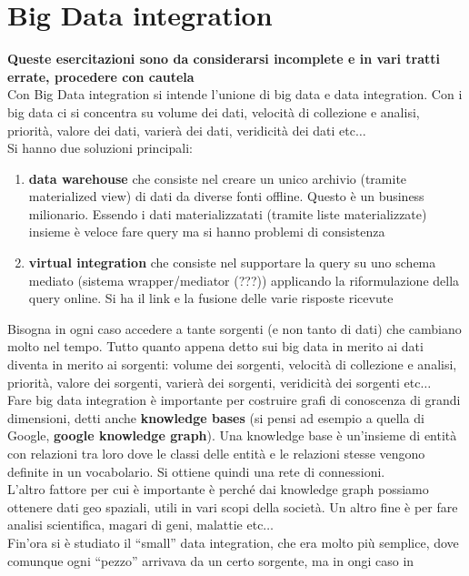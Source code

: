 \documentclass[a4paper,12pt, oneside]{book}
\begin{document}
\section{Big Data integration}
\textbf{Queste esercitazioni sono da considerarsi incomplete e in vari tratti 
errate, procedere con cautela}\\
Con Big Data integration si intende l'unione di big data e data integration. Con
i big data ci si concentra su volume dei dati, velocità di collezione e analisi,
priorità, valore dei dati, varierà dei dati, veridicità dei dati etc$\ldots$\\
Si hanno due soluzioni principali:
\begin{enumerate}
  \item \textbf{data warehouse} che consiste nel creare un unico archivio
  (tramite materialized view) di dati da diverse fonti offline. Questo è un
  business milionario. Essendo i dati materializzatati (tramite liste
  materializzate) insieme è veloce fare query ma si hanno problemi di
  consistenza 
  \item \textbf{virtual integration} che consiste nel supportare la query su
  uno schema mediato (sistema wrapper/mediator (???)) applicando la
  riformulazione della query online. Si ha il link e la fusione delle varie
  risposte ricevute
\end{enumerate}
Bisogna in ogni caso accedere a tante sorgenti (e non tanto di dati) che
cambiano molto nel tempo. Tutto quanto appena detto sui big data in merito ai
dati diventa in merito ai sorgenti: volume dei sorgenti, velocità di collezione
e analisi, priorità, valore dei sorgenti, varierà dei sorgenti, veridicità dei
sorgenti etc$\ldots$\\ 
Fare big data integration è importante per costruire grafi di conoscenza di
grandi dimensioni, detti anche \textbf{knowledge bases} (si pensi ad esempio a
quella di Google, \textbf{google knowledge graph}). Una knowledge base è
un'insieme di entità con relazioni tra 
loro dove le classi delle entità e le relazioni stesse vengono definite in un
vocabolario. Si ottiene quindi una rete di connessioni.\\
L'altro fattore per cui è importante è perché dai knowledge graph possiamo
ottenere dati geo spaziali, utili in vari scopi della società. Un altro fine è
per fare analisi scientifica, magari di geni, malattie etc$\ldots$\\
Fin'ora si è studiato il ``small'' data integration, che era molto più semplice,
dove comunque ogni ``pezzo'' arrivava da un certo sorgente, ma in ongi caso in
\end{document}
